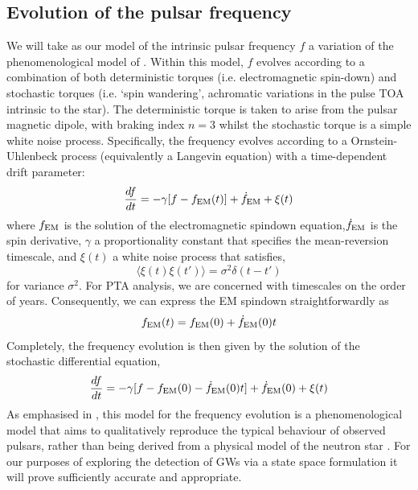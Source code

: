 \documentclass[fleqn,usenatbib,useAMS]{mnras}
\begin{document}
\subsection{Evolution of the pulsar frequency}
We will take as our model of the intrinsic pulsar frequency $f$ a variation of the phenomenological model of \cite{Vargas}. Within this model, $f$ evolves according to a combination of both deterministic torques (i.e. electromagnetic spin-down) and stochastic torques (i.e. `spin wandering', achromatic variations in the pulse TOA intrinsic to the star). The deterministic torque is taken to arise from the pulsar magnetic dipole, with braking index $n=3$ whilst the stochastic torque is a simple white noise process. Specifically, the frequency evolves according to a Ornstein-Uhlenbeck process (equivalently a Langevin equation) with a time-dependent drift parameter:
\begin{equation}
	\frac{df}{dt} = -\gamma	 [f - f_{\rm EM} (t)] + \dot{f}_{\rm EM} + \xi(t)
	\label{eq:frequency_evolution}
\end{equation}
where $f_{\rm EM}$ is the solution of the electromagnetic spindown equation,$\dot{f}_{\rm EM}$ is the spin derivative, $\gamma$ a proportionality constant that specifies the mean-reversion timescale, and $\xi(t)$ a white noise process that satisfies,
\begin{equation}
	\langle \xi(t) \xi(t') \rangle = \sigma^2 \delta(t - t')
\end{equation}
for variance $\sigma^2$. For PTA analysis, we are concerned with timescales on the order of years. Consequently, we can express the EM spindown straightforwardly as
\begin{equation}
	f_{\rm EM} (t) = f_{\rm EM}(0) + \dot{f}_{\rm EM} (0)t
\end{equation}  
Completely, the frequency evolution is then given by the solution of the stochastic differential equation,
\begin{equation}
	\frac{df}{dt} = -\gamma	 [f - f_{\rm EM}(0) - \dot{f}_{\rm EM} (0)t] + \dot{f}_{\rm EM} (0) + \xi(t)
	\label{eq:frequency_evolution_expanded}
\end{equation}
As emphasised in \cite{Vargas}, this model for the frequency evolution is a phenomenological model that aims to qualitatively reproduce the typical behaviour of observed pulsars, rather than being derived from a physical model of the neutron star \citep[e.g. a model of the neutron star crust and superfluid, components][]{Meyers2021}. For our purposes of exploring the detection of GWs via a state space formulation it will prove sufficiently accurate and appropriate.
\end{document}
